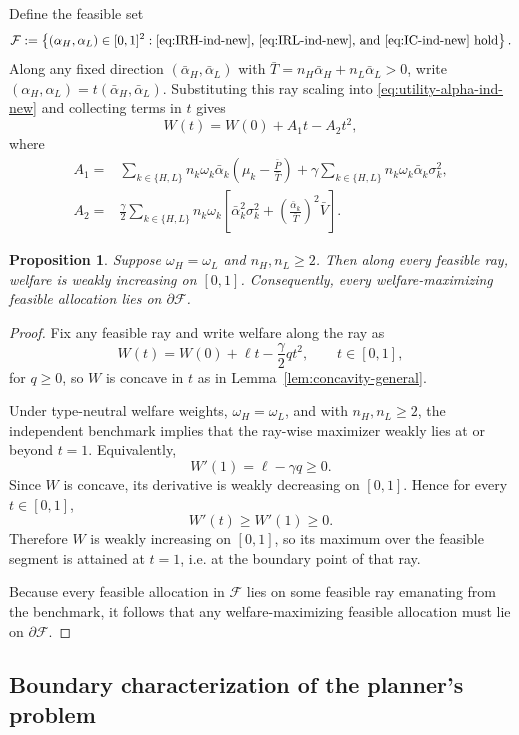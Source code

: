\documentclass[a4paper,12pt]{article}
\newtheorem{proposition}[theorem]{Proposition}
\theoremstyle{definition}
\theoremstyle{remark}
\newcommand{\1}{\mathbf{1}}
\begin{document}
Define the feasible set
\[
\mathcal F
:=
\left\{(\alpha_H,\alpha_L) \in [0,1]^2 :
\text{\eqref{eq:IRH-ind-new}, \eqref{eq:IRL-ind-new}, and \eqref{eq:IC-ind-new} hold}
\right\}.
\]
Along any fixed direction \((\bar\alpha_H,\bar\alpha_L)\) with
\(\bar T=n_H\bar\alpha_H+n_L\bar\alpha_L>0\), write
\((\alpha_H,\alpha_L)=t(\bar\alpha_H,\bar\alpha_L)\). Substituting this ray
scaling into \eqref{eq:utility-alpha-ind-new} and collecting terms in \(t\)
gives
\[
W(t)=W(0)+A_1t-A_2t^2,
\]
where
\begin{align*}
A_1
={}&
\sum_{k\in\{H,L\}} n_k \omega_k \bar\alpha_k
\left(\mu_k-\frac{\bar P}{\bar T}\right)
+
\gamma
\sum_{k\in\{H,L\}} n_k \omega_k \bar\alpha_k \sigma_k^2,
\\
A_2
={}&
\frac{\gamma}{2}
\sum_{k\in\{H,L\}} n_k \omega_k
\left[
\bar\alpha_k^2 \sigma_k^2
+
\left(\frac{\bar\alpha_k}{\bar T}\right)^2 \bar V
\right].
\end{align*}


\begin{proposition}
\label{prop:boundary-opt-ind-new}
Suppose \(\omega_H=\omega_L\) and \(n_H,n_L\ge 2\). Then along every feasible
ray, welfare is weakly increasing on \([0,1]\). Consequently, every
welfare-maximizing feasible allocation lies on \(\partial\mathcal F\).
\end{proposition}

\begin{proof}
Fix any feasible ray and write welfare along the ray as
\[
W(t)=W(0)+\ell t-\frac{\gamma}{2}qt^2, \qquad t\in[0,1],
\]
for \(q\ge 0\), so \(W\) is concave in \(t\) as in Lemma~\ref{lem:concavity-general}.

Under type-neutral welfare weights, \(\omega_H=\omega_L\), and with
\(n_H,n_L\ge 2\), the independent benchmark implies that the ray-wise
maximizer weakly lies at or beyond \(t=1\). Equivalently,
\[
W'(1)=\ell-\gamma q \ge 0.
\]
Since \(W\) is concave, its derivative is weakly decreasing on \([0,1]\). Hence
for every \(t\in[0,1]\),
\[
W'(t)\ge W'(1)\ge 0.
\]
Therefore \(W\) is weakly increasing on \([0,1]\), so its maximum over the
feasible segment is attained at \(t=1\), i.e. at the boundary point of that ray.

Because every feasible allocation in \(\mathcal F\) lies on some feasible ray
emanating from the benchmark, it follows that any welfare-maximizing feasible
allocation must lie on \(\partial\mathcal F\).
\end{proof}


\subsection{Boundary characterization of the planner's problem}
\end{document}
